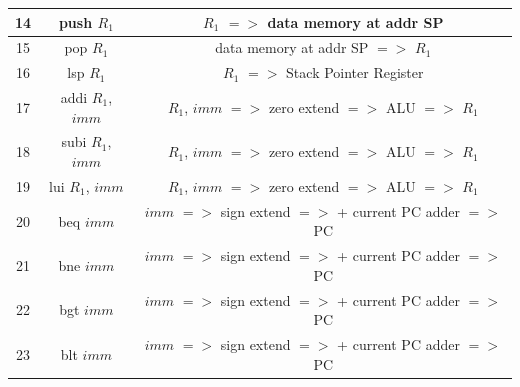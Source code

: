 \documentclass{article}
\begin{document}
\begin{par}
\begin{center}
\begin{tabular}{|c|c|c|}
			14 & push $ R_{1} $ & $ R_{1} $ $ => $ data memory at addr SP \\
			\hline
			15 & pop $ R_{1} $ & data memory at addr SP $ => $ $ R_{1} $ \\
			\hline
			16 & lsp $ R_{1} $ & $ R_{1} $ $ => $ Stack Pointer Register \\
			\hline
			17 & addi $ R_{1} $, $ imm $ &  $ R_{1} $, $ imm $ $ => $ zero extend $ => $ ALU $ => $ $ R_{1} $ \\
			\hline
			18 & subi $ R_{1} $, $ imm $ & $ R_{1} $, $ imm $ $ => $ zero extend $ => $ ALU $ => $ $ R_{1} $ \\
			\hline
			19 & lui $ R_{1} $, $ imm $ & $ R_{1} $, $ imm $ $ => $ zero extend $ => $ ALU $ => $ $ R_{1} $ \\
			\hline
			20 & beq $ imm $ & $ imm $ $ => $ sign extend $ => $ + current PC adder $ => $ PC \\
			\hline
			21 & bne $ imm $ & $ imm $ $ => $ sign extend $ => $ + current PC adder $ => $ PC \\
			\hline
			22 & bgt $ imm $ & $ imm $ $ => $ sign extend $ => $ + current PC adder $ => $ PC \\
			\hline
			23 & blt $ imm $ & $ imm $ $ => $ sign extend $ => $ + current PC adder $ => $ PC \\
			\hline
		\end{tabular}
	\end{center}
	
\end{par}
\newpage
\end{document}
